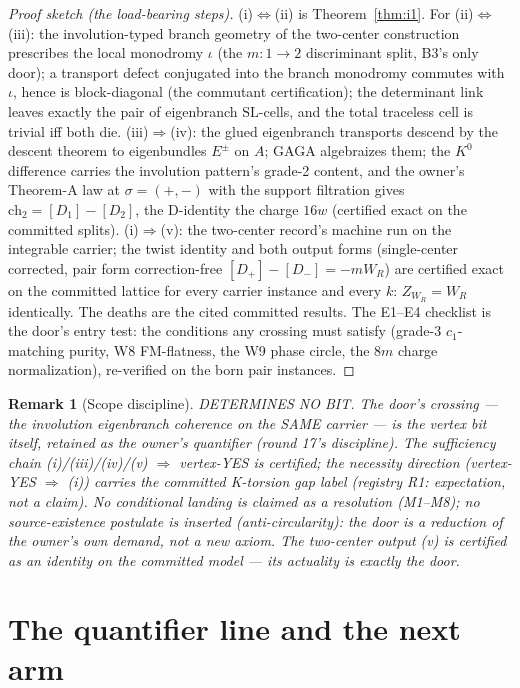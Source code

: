 \documentclass[11pt]{article}
\newtheorem{remark}[theorem]{Remark}
\begin{document}
\begin{proof}[Proof sketch (the load-bearing steps)]
(i)$\iff$(ii) is Theorem~\ref{thm:i1}. For (ii)$\iff$(iii): the involution-typed
branch geometry of the two-center construction prescribes the local monodromy
$\iota$ (the $m{:}1\to2$ discriminant split, B3's only door); a transport defect
conjugated into the branch monodromy commutes with $\iota$, hence is block-diagonal
(the commutant certification); the determinant link leaves exactly the pair of
eigenbranch $\mathrm{SL}$-cells, and the total traceless cell is trivial iff both die.
(iii)$\Rightarrow$(iv): the glued eigenbranch transports descend by the descent
theorem to eigenbundles $E^\pm$ on $A$; GAGA algebraizes them; the $K^0$ difference
carries the involution pattern's grade-2 content, and the owner's Theorem-A law at
$\sigma=(+,-)$ with the support filtration gives $\mathrm{ch}_2=[D_1]-[D_2]$, the
D-identity the charge $16w$ (certified exact on the committed splits).
(i)$\Rightarrow$(v): the two-center record's machine run on the integrable carrier;
the twist identity and both output forms (single-center corrected, pair form
correction-free $[D_+]-[D_-]=-mW_R$) are certified exact on the committed lattice
for every carrier instance and every $k$: $Z_{W_R}=W_R$ identically.
The deaths are the cited committed results. The E1--E4 checklist is the door's entry
test: the conditions any crossing must satisfy (grade-3 $c_1$-matching purity, W8
FM-flatness, the W9 phase circle, the $8m$ charge normalization), re-verified on the
born pair instances.
\end{proof}

\begin{remark}[Scope discipline]
DETERMINES NO BIT. The door's crossing --- the involution eigenbranch coherence on the
SAME carrier --- is the vertex bit itself, retained as the owner's quantifier (round 17's
discipline). The sufficiency chain (i)/(iii)/(iv)/(v) $\Rightarrow$ vertex-YES is
certified; the necessity direction (vertex-YES $\Rightarrow$ (i)) carries the committed
K-torsion gap label (registry R1: expectation, not a claim). No conditional landing is
claimed as a resolution (M1--M8); no source-existence postulate is inserted
(anti-circularity): the door is a \emph{reduction} of the owner's own demand, not a new
axiom. The two-center output (v) is certified as an \emph{identity} on the committed
model --- its actuality is exactly the door.
\end{remark}

\section{The quantifier line and the next arm}
\end{document}
